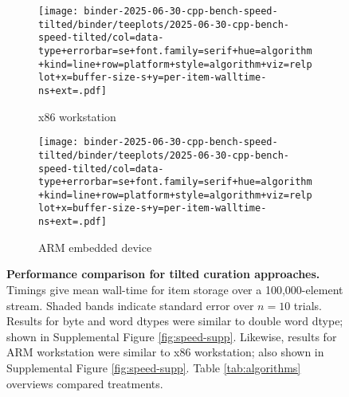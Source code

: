 \begin{figure}


\begin{subfigure}{\linewidth}
\texttt{[image: binder-2025-06-30-cpp-bench-speed-tilted/binder/teeplots/2025-06-30-cpp-bench-speed-tilted/col=data-type+errorbar=se+font.family=serif+hue=algorithm+kind=line+row=platform+style=algorithm+viz=relplot+x=buffer-size-s+y=per-item-walltime-ns+ext=.pdf]}
\caption{\small x86 workstation}
\label{fig:speed:thinkpad}
\end{subfigure}

\begin{subfigure}{\linewidth}
\texttt{[image: binder-2025-06-30-cpp-bench-speed-tilted/binder/teeplots/2025-06-30-cpp-bench-speed-tilted/col=data-type+errorbar=se+font.family=serif+hue=algorithm+kind=line+row=platform+style=algorithm+viz=relplot+x=buffer-size-s+y=per-item-walltime-ns+ext=.pdf]}
\caption{\small ARM embedded device}
\label{fig:speed:pi}
\end{subfigure}

\caption{%
\textbf{Performance comparison for tilted curation approaches.}
\small
Timings give mean wall-time for item storage over a 100,000-element stream.
Shaded bands indicate standard error over $n=10$ trials.
Results for byte and word dtypes were similar to double word dtype; shown in Supplemental Figure \ref{fig:speed-supp}.
Likewise, results for ARM workstation were similar to x86 workstation; also shown in Supplemental Figure \ref{fig:speed-supp}.
Table \ref{tab:algorithms} overviews compared treatments.
}
\label{fig:speed}
\end{figure}

